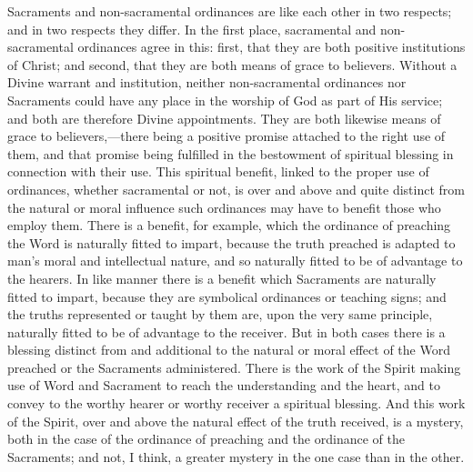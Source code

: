 \documentclass[
]{book}
\begin{document}
Sacraments and non-sacramental ordinances are like each other in two respects; and in two respects they differ. In the first place, sacramental and non-sacramental ordinances agree in this: first, that they are both positive institutions of Christ; and second, that they are both means of grace to believers. Without a Divine warrant and institution, neither non-sacramental ordinances nor Sacraments could have any place in the worship of God as part of His service; and both are therefore Divine appointments. They are both likewise means of grace to believers,---there being a positive promise attached to the right use of them, and that promise being fulfilled in the bestowment of spiritual blessing in connection with their use. This spiritual benefit, linked to the proper use of ordinances, whether sacramental or not, is over and above and quite distinct from the natural or moral influence such ordinances may have to benefit those who employ them. There is a benefit, for example, which the ordinance of preaching the Word is naturally fitted to impart, because the truth preached is adapted to man's moral and intellectual nature, and so naturally fitted to be of advantage to the hearers. In like manner there is a benefit which Sacraments are naturally fitted to impart, because they are symbolical ordinances or teaching signs; and the truths represented or taught by them are, upon the very same principle, naturally fitted to be of advantage to the receiver. But in both cases there is a blessing distinct from and additional to the natural or moral effect of the Word preached or the Sacraments administered. There is the work of the Spirit making use of Word and Sacrament to reach the understanding and the heart, and to convey to the worthy hearer or worthy receiver a spiritual blessing. And this work of the Spirit, over and above the natural effect of the truth received, is a mystery, both in the case of the ordinance of preaching and the ordinance of the Sacraments; and not, I think, a greater mystery in the one case than in the other.
\end{document}
